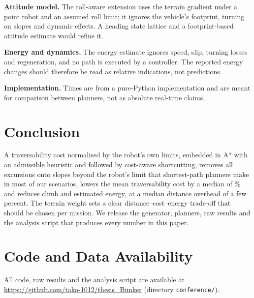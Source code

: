 \documentclass[conference]{IEEEtran}
\begin{document}
\textbf{Attitude model.} The roll-aware extension uses the terrain gradient
under a point robot and an assumed roll limit; it ignores the vehicle's
footprint, turning on slopes and dynamic effects. A heading state lattice and
a footprint-based attitude estimate would refine it.

\textbf{Energy and dynamics.} The energy estimate ignores speed, slip,
turning losses and regeneration, and no path is executed by a controller.
The reported energy changes should therefore be read as relative indications,
not predictions.

\textbf{Implementation.} Times are from a pure-Python implementation and are
meant for comparison between planners, not as absolute real-time claims.

\section{Conclusion}
A traversability cost normalised by the robot's own limits, embedded in A*
with an admissible heuristic and followed by cost-aware shortcutting, removes
all excursions onto slopes beyond the robot's limit that shortest-path
planners make in most of our scenarios, lowers the mean
traversability cost by a median of \costRelTAS\% and reduces climb and estimated energy, at a median
distance overhead of a few percent. The terrain weight sets a clear
distance--cost--energy trade-off that should be chosen per mission. We
release the generator, planners, raw results and the analysis script that
produces every number in this paper.

\section*{Code and Data Availability}
All code, raw results and the analysis script are available at
\url{https://github.com/tako-1012/thesis_Bunker} (directory \texttt{conference/}).



\end{document}
